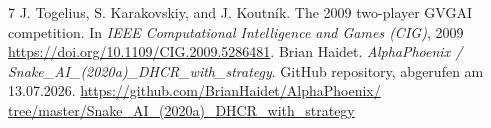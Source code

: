 \documentclass[a4paper]{scrartcl}
\begin{document}
\begin{thebibliography}{7}
 J. Togelius, S. Karakovskiy, and J. Koutník. The 2009 two-player {GVGAI} competition. In \textit{IEEE Computational Intelligence and Games (CIG)}, 2009 \href{https://doi.org/10.1109/CIG.2009.5286481}{https://doi.org/10.1109/CIG.2009.5286481}.
 Brian Haidet. \textit{AlphaPhoenix / Snake\_AI\_(2020a)\_DHCR\_with\_strategy}. GitHub repository, abgerufen am 13.07.2026. \href{https://github.com/BrianHaidet/AlphaPhoenix/tree/master/Snake_AI_(2020a)_DHCR_with_strategy}{https://github.com/BrianHaidet/AlphaPhoenix/ tree/master/Snake\_AI\_(2020a)\_DHCR\_with\_strategy}
\end{thebibliography}
\end{document}
